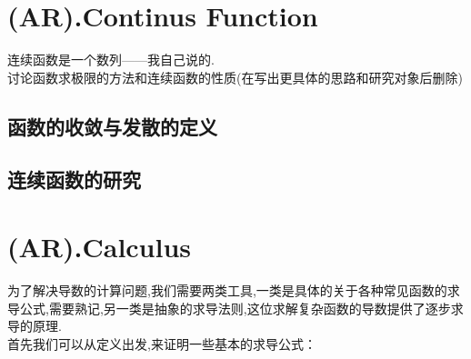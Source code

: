 \documentclass{article}
\begin{document}
\section{(AR).Continus Function}

\noindent 连续函数是一个数列——我自己说的.\\

\noindent 讨论函数求极限的方法和连续函数的性质(在写出更具体的思路和研究对象后删除)\\



\subsection{函数的收敛与发散的定义}
\newpage

\subsection{连续函数的研究}

















\newpage













\section{(AR).Calculus}

\noindent 为了解决导数的计算问题,我们需要两类工具,一类是具体的关于各种常见函数的求导公式,需要熟记,另一类是抽象的求导法则,这位求解复杂函数的导数提供了逐步求导的原理.\\

\noindent 首先我们可以从定义出发,来证明一些基本的求导公式：
\end{document}
